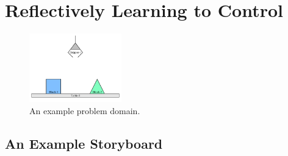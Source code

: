 \chapter{Reflectively Learning to Control}
\label{chapter:reflectively_learning_to_control}


\begin{figure}
\begin{center}
\includegraphics[width=4cm]{gfx/blocks_world_example-1}
\end{center}
\caption[An example problem domain.]{An example problem domain.}
\label{figure:an_example_problem_domain}
\end{figure}

\section{An Example Storyboard}

